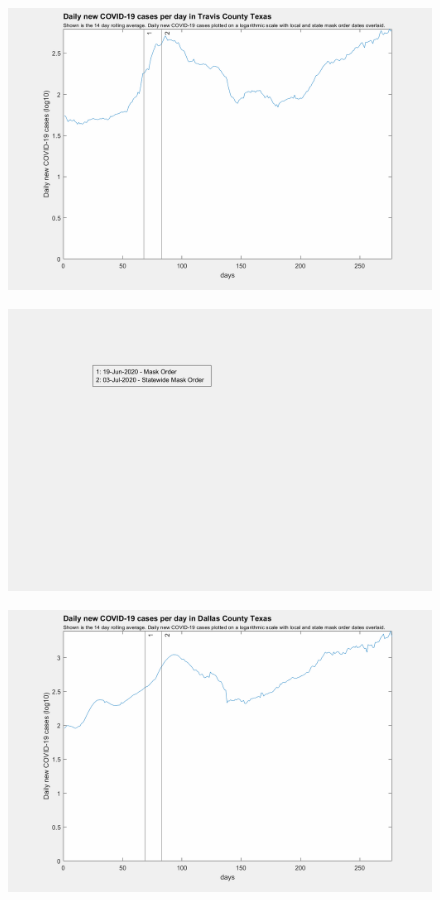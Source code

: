\documentclass[]{article}
\begin{document}
\begin{figure}[!h]
	\includegraphics[width=\linewidth]{images/travis_mask_order_log.png}
	\caption{}
	\label{fig:images/travis_mask_order_logLabel}
\end{figure}

\begin{figure}[!h]
	\includegraphics[width=\linewidth]{legends/dallas_mask_order_legend.png}
	\caption{}
	\label{fig:legends/dallas_mask_order_legendLabel}
\end{figure}

\begin{figure}[!h]
	\includegraphics[width=\linewidth]{images/dallas_mask_order_log.png}
	\caption{}
	\label{fig:images/dallas_mask_order_logLabel}
\end{figure}
\end{document}
